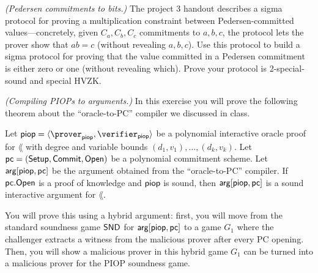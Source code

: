 \begin{questions}
\begin{parts}
    \begin{solution}

    \end{solution}
  \end{parts}
  \question \emph{(Pedersen commitments to bits.)} The project 3 handout describes a sigma protocol for proving a multiplication constraint between Pedersen-committed values---concretely, given $C_a,C_b,C_c$ commitments to $a,b,c$, the protocol lets the prover show that $ab=c$ (without revealing $a,b,c$). Use this protocol to build a sigma protocol for proving that the value committed in a Pedersen commitment is either zero or one (without revealing which). Prove your protocol is 2-special-sound and special HVZK.

  \begin{solution}
  
  \end{solution}

\question \emph{(Compiling PIOPs to arguments.)}  In this exercise you will prove the following theorem about the ``oracle-to-PC'' compiler we discussed in class.

\begin{theorem*}
  Let $\piop = \langle \prover_{\piop}, \verifier_{\piop}\rangle$ be a polynomial interactive oracle proof for $\lang$ with degree and variable bounds $(d_1, v_1), \ldots, (d_k, v_k)$. Let $\mathsf{pc} = (\mathsf{Setup}, \mathsf{Commit}, \mathsf{Open})$ be a polynomial commitment scheme. Let $\mathsf{arg}[\mathsf{piop}, \mathsf{pc}]$ be the argument obtained from the ``oracle-to-PC'' compiler. If $\mathsf{pc}.\mathsf{Open}$ is a proof of knowledge and $\mathsf{piop}$ is sound, then $\mathsf{arg}[\mathsf{piop},\mathsf{pc}]$ is a sound interactive argument for $\lang$.
\end{theorem*}

  You will prove this using a hybrid argument: first, you will move from the standard soundness game $\mathsf{SND}$ for $\mathsf{arg}[\mathsf{piop},\mathsf{pc}]$ to a game $G_1$ where the challenger extracts a witness from the malicious prover after every PC opening. Then, you will show a malicious prover in this hybrid game $G_1$ can be turned into a malicious prover for the PIOP soundness game.

\end{questions}
